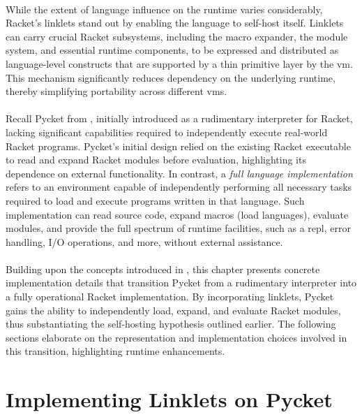 	\paragraph{}%
		While the extent of language influence on the runtime varies considerably, Racket's linklets stand out by enabling the language to self-host itself. Linklets can carry crucial Racket subsystems, including the macro expander, the module system, and essential runtime components, to be expressed and distributed as language-level constructs that are supported by a thin primitive layer by the \gls{vm}. This mechanism significantly reduces dependency on the underlying runtime, thereby simplifying portability across different \glspl{vm}.

	\paragraph{}%
		Recall Pycket from , initially introduced as a rudimentary interpreter for Racket, lacking significant capabilities required to independently execute real-world Racket programs. Pycket's initial design relied on the existing Racket executable to read and expand Racket modules before evaluation, highlighting its dependence on external functionality. In contrast, a \emph{full language implementation} refers to an environment capable of independently performing all necessary tasks required to load and execute programs written in that language. Such implementation can read source code, expand macros (load languages), evaluate modules, and provide the full spectrum of runtime facilities, such as a \gls{repl}, error handling, I/O operations, and more, without external assistance.

	\paragraph{}%
		Building upon the concepts introduced in , this chapter presents concrete implementation details that transition Pycket from a rudimentary interpreter into a fully operational Racket implementation. By incorporating linklets, Pycket gains the ability to independently load, expand, and evaluate Racket modules, thus substantiating the self-hosting hypothesis outlined earlier. The following sections elaborate on the representation and implementation choices involved in this transition, highlighting runtime enhancements.

	\section[\texorpdfstring{Implementing Linklets on Pycket}{Linklets on Pycket}]{Implementing Linklets on Pycket}

